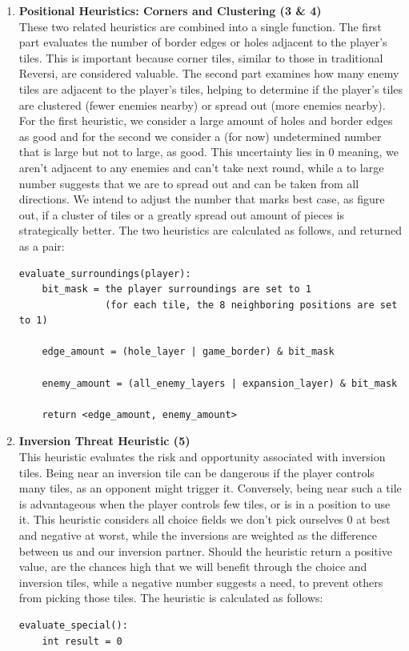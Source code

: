 \begin{enumerate}
\begin{lstlisting}
    // Build a layer containing only opponent tiles
    opponent_tiles_layer = opponent_layer(player) NAND expansion_tile
    total_pieces = Sum of bits set in opponent_tiles_layer

    if total_pieces is 0:
        return 0
 
    return (player_pieces / total_pieces) * 100
    \end{lstlisting}

    \item \textbf{Positional Heuristics: Corners and Clustering (3 \& 4)} \\
    These two related heuristics are combined into a single function. The first part evaluates the number of border edges or holes adjacent to the player's tiles. This is important because corner tiles, similar to those in traditional Reversi, are considered valuable. The second part examines how many enemy tiles are adjacent to the player’s tiles, helping to determine if the player’s tiles are clustered (fewer enemies nearby) or spread out (more enemies nearby). For the first heuristic, we consider a large amount of holes and border edges as good and for the second we consider a (for now) undetermined number that is large but not to large, as good. This uncertainty lies in 0 meaning, we aren't adjacent to any enemies and can't take next round, while a to large number suggests that we are to spread out and can be taken from all directions. We intend to adjust the number that marks best case, as figure out, if a cluster of tiles or a greatly spread out amount of pieces is strategically better. The two heuristics are calculated as follows, and returned as a pair:
    \begin{lstlisting}
evaluate_surroundings(player):
    bit_mask = the player surroundings are set to 1 
               (for each tile, the 8 neighboring positions are set to 1)

    edge_amount = (hole_layer | game_border) & bit_mask

    enemy_amount = (all_enemy_layers | expansion_layer) & bit_mask

    return <edge_amount, enemy_amount>
    \end{lstlisting}
    \item \textbf{Inversion Threat Heuristic (5)} \\
    This heuristic evaluates the risk and opportunity associated with inversion tiles. Being near an inversion tile can be dangerous if the player controls many tiles, as an opponent might trigger it. Conversely, being near such a tile is advantageous when the player controls few tiles, or is in a position to use it. This heuristic considers all choice fields we don't pick ourselves 0 at best and negative at worst, while the inversions are weighted as the difference between us and our inversion partner. Should the heuristic return a positive value, are the chances high that we will benefit through the choice and inversion tiles, while a negative number suggests a need, to prevent others from picking those tiles. The heuristic is calculated as follows:
    \begin{lstlisting}
evaluate_special():
    int result = 0


\end{lstlisting}
\end{enumerate}
